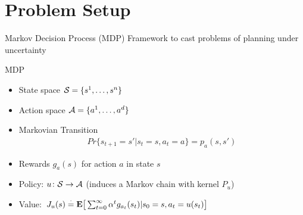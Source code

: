 \documentclass[10pt]{beamer}
\begin{document}
\section{Problem Setup}
\begin{frame}[fragile]{Markov Decision Process (MDP)}
Framework to cast problems of planning under uncertainty
\begin{block}{MDP}
\begin{itemize}
\item State space $\S=\{s^1,\ldots,s^n\}$
\item Action space $\A=\{a^1,\ldots,a^d\}$
\item Markovian Transition
\begin{align*}
Pr\{s_{t+1}=s'| s_t=s, a_t=a\}=p_a(s,s')
\end{align*}
\item Rewards $g_a(s)$ for action $a$ in state $s$
\item Policy: $u\colon \S\ra \A$ (induces a Markov chain with kernel $P_u$)
\item Value: $J_u(s)\eqdef \E\big[\sum_{t=0}^\infty \alpha^t g_{a_t}(s_t)|s_0=s,a_t=u(s_t)\big]$
\end{itemize}
\end{block}



\end{frame}
\end{document}
